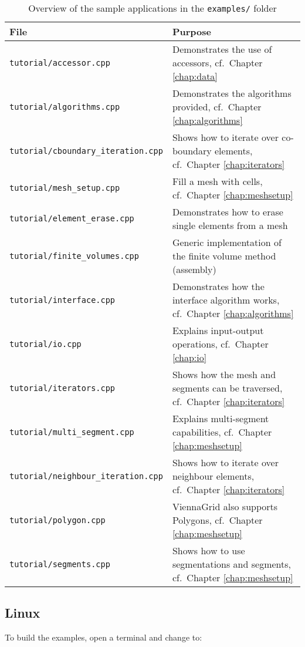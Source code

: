 \begin{table}[tb]
\begin{center}
\begin{tabular}{l|p{9.3cm}}
File & Purpose\\
\hline
\texttt{tutorial/accessor.cpp}              & Demonstrates the use of accessors, cf.~Chapter \ref{chap:data} \\
\texttt{tutorial/algorithms.cpp}            & Demonstrates the algorithms provided, cf.~Chapter \ref{chap:algorithms} \\
\texttt{tutorial/cboundary\_iteration.cpp}  & Shows how to iterate over co-boundary elements, cf.~Chapter \ref{chap:iterators} \\
\texttt{tutorial/mesh\_setup.cpp}         & Fill a mesh with cells, cf.~Chapter \ref{chap:meshsetup} \\
\texttt{tutorial/element\_erase.cpp}        & Demonstrates how to erase single elements from a mesh \\
\texttt{tutorial/finite\_volumes.cpp}       & Generic implementation of the finite volume method (assembly) \\
\texttt{tutorial/interface.cpp}             & Demonstrates how the interface algorithm works, cf.~Chapter \ref{chap:algorithms} \\
\texttt{tutorial/io.cpp}                    & Explains input-output operations, cf.~Chapter \ref{chap:io} \\
\texttt{tutorial/iterators.cpp}             & Shows how the mesh and segments can be traversed, cf.~Chapter \ref{chap:iterators} \\
\texttt{tutorial/multi\_segment.cpp}        & Explains multi-segment capabilities, cf.~Chapter \ref{chap:meshsetup} \\
\texttt{tutorial/neighbour\_iteration.cpp}  & Shows how to iterate over neighbour elements, cf.~Chapter \ref{chap:iterators} \\
\texttt{tutorial/polygon.cpp}               & ViennaGrid also supports Polygons, cf.~Chapter \ref{chap:meshsetup} \\
\texttt{tutorial/segments.cpp}              & Shows how to use segmentations and segments, cf.~Chapter \ref{chap:meshsetup}
\end{tabular}
\caption{Overview of the sample applications in the \texttt{examples/} folder}
\label{tab:tutorial-dependencies}
\end{center}
\end{table}

\subsection{Linux}
To build the examples, open a terminal and change to:

